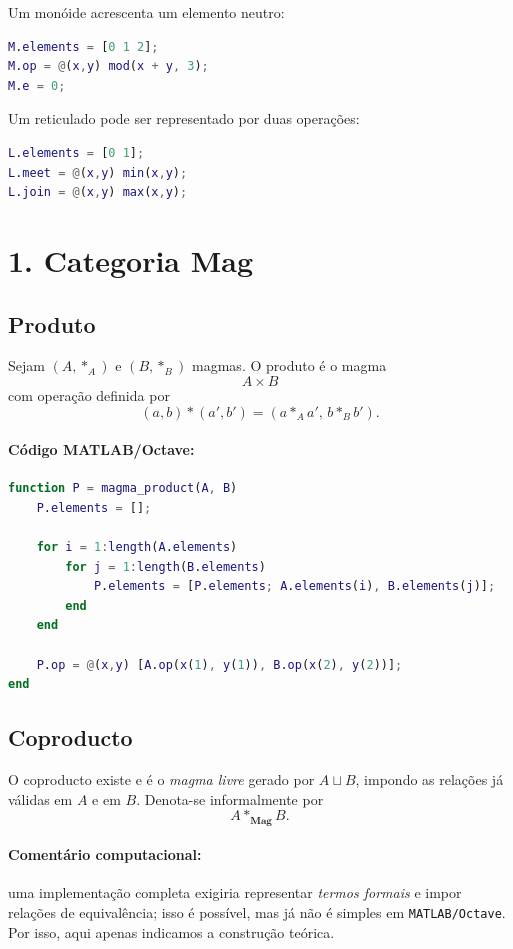 \documentclass[a4paper,12pt]{article}
\begin{document}
Um monóide acrescenta um elemento neutro:

\begin{lstlisting}[language=Matlab]
M.elements = [0 1 2];
M.op = @(x,y) mod(x + y, 3);
M.e = 0;
\end{lstlisting}

Um reticulado pode ser representado por duas operações:

\begin{lstlisting}[language=Matlab]
L.elements = [0 1];
L.meet = @(x,y) min(x,y);
L.join = @(x,y) max(x,y);
\end{lstlisting}

\section*{1. Categoria \(\mathbf{Mag}\)}

\subsection*{Produto}

Sejam $(A,\ast_A)$ e $(B,\ast_B)$ magmas. O produto é o magma
\[
A\times B
\]
com operação definida por
\[
(a,b)\ast(a',b')=(a\ast_A a',\, b\ast_B b').
\]

\paragraph{Código MATLAB/Octave:}
\begin{lstlisting}[language=Matlab]
function P = magma_product(A, B)
    P.elements = [];
    
    for i = 1:length(A.elements)
        for j = 1:length(B.elements)
            P.elements = [P.elements; A.elements(i), B.elements(j)];
        end
    end
    
    P.op = @(x,y) [A.op(x(1), y(1)), B.op(x(2), y(2))];
end
\end{lstlisting}

\subsection*{Coproducto}

O coproducto existe e é o \emph{magma livre} gerado por $A\sqcup B$, impondo as
relações já válidas em $A$ e em $B$. Denota-se informalmente por
\[
A\ast_{\mathbf{Mag}} B.
\]

\paragraph{Comentário computacional:}
uma implementação completa exigiria representar \emph{termos formais} e impor
relações de equivalência; isso é possível, mas já não é simples em
\texttt{MATLAB/Octave}. Por isso, aqui apenas indicamos a construção teórica.
\end{document}
